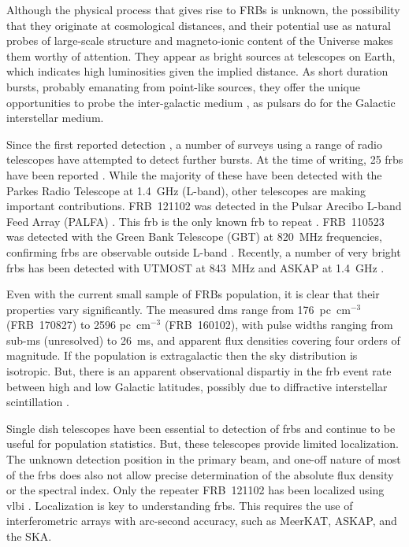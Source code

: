 \documentclass[a4paper,fleqn,usenatbib]{mnras}
\begin{document}
Although the physical process that gives rise to FRBs is unknown, the
possibility that they originate at cosmological distances, and their potential
use as natural probes of large-scale structure and magneto-ionic content of the
Universe makes them worthy of attention. They appear as bright sources at
telescopes on Earth, which indicates high luminosities given the implied
distance.  As short duration bursts, probably emanating from point-like sources,
they offer the unique opportunities to probe the inter-galactic medium
\citep[IGM;][]{2013ApJ...776..125M}, as pulsars do for the Galactic interstellar
medium.

Since the first reported detection \citep{2007Sci...318..777L}, a number of
surveys using a range of radio telescopes have attempted to detect further
bursts. At the time of writing, 25 \glspl{frb} have been reported \citep[for an
up-to-date list, see][]{2016PASA...33...45P}. While the majority of these have
been detected with the Parkes Radio Telescope at 1.4~GHz (L-band), other
telescopes are making important contributions. FRB~121102 was detected in the
Pulsar Arecibo L-band Feed Array (PALFA) \citep{2014ApJ...790..101S}. This
\gls{frb} is the only known \gls{frb} to repeat \citep{2016ApJ...833..177S}.
FRB~110523 was detected with the Green Bank Telescope (GBT) at 820~MHz
frequencies, confirming \glspl{frb} are observable outside L-band
\citep{2015Natur.528..523M}.  Recently, a number of very bright \glspl{frb} has
been detected with UTMOST at 843~MHz \citep{2017MNRAS.468.3746C,atel10697,atel10867} and
ASKAP at 1.4~GHz \citep{2017ApJ...841L..12B}.

Even with the current small sample of FRBs population, it is clear that their
 properties vary significantly. The measured \glspl{dm} range from
176~pc~cm$^{-3}$ (FRB~170827) to 2596 pc~cm$^{-3}$ (FRB~160102), with pulse
widths ranging from sub-ms (unresolved) to 26~ms, and apparent flux densities
covering four orders of magnitude.  If the population is extragalactic then the
sky distribution is isotropic.  But, there is an apparent observational
dispartiy in the \gls{frb} event rate between high and low Galactic latitudes,
possibly due to diffractive interstellar scintillation
\citep{2015MNRAS.451.3278M}.

Single dish telescopes have been essential to detection of \glspl{frb} and
continue to be useful for population statistics.  But, these telescopes provide
limited localization.  The unknown detection position in the primary beam, and
one-off nature of most of the \glspl{frb} does also not allow precise
determination of the absolute flux density or the spectral index. Only the
repeater FRB~121102 has been localized using \gls{vlbi}
\citep{2017ApJ...834L...8M, 2017ApJ...834L...7T}. Localization is key to
understanding \glspl{frb}. This requires the use of interferometric arrays with
arc-second accuracy, such as MeerKAT, ASKAP, and the SKA. 
\end{document}
